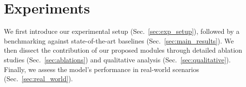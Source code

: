 \section{Experiments} \label{sec:experiments}







We first introduce our experimental setup (Sec.~\ref{sec:exp_setup}), followed by a benchmarking against state-of-the-art baselines (Sec.~\ref{sec:main_results}). We then dissect the contribution of our proposed modules through detailed ablation studies (Sec.~\ref{sec:ablations}) and qualitative analysis (Sec.~\ref{sec:qualitative}). Finally, we assess the model's performance in real-world scenarios (Sec.~\ref{sec:real_world}).

